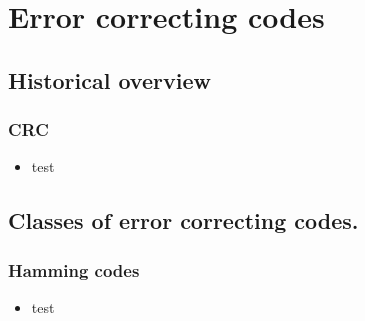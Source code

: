 \section[ECC]{Error correcting codes}
	\subsection{Historical overview}
	
		\begin{frame}
			\frametitle{CRC}
			\begin{itemize}
				\item test
			\end{itemize}
		\end{frame}
		
	\subsection{Classes of error correcting codes.}
		\begin{frame}
			\frametitle{Hamming codes}
			\begin{itemize}
				\item test
			\end{itemize}
		\end{frame}